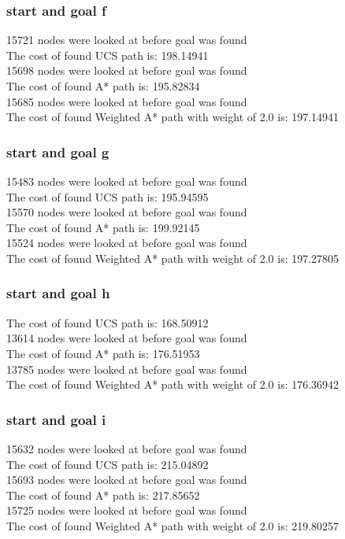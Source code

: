 \documentclass[11pt]{article} %
\begin{document}
\subsubsection{start and goal f}
15721 nodes were looked at before goal was found\\
The cost of found UCS path is: 198.14941\\
15698 nodes were looked at before goal was found\\
The cost of found A* path is: 195.82834\\
15685 nodes were looked at before goal was found\\
The cost of found Weighted A* path with weight of 2.0 is: 197.14941\\
\subsubsection{start and goal g}
15483 nodes were looked at before goal was found\\
The cost of found UCS path is: 195.94595\\
15570 nodes were looked at before goal was found\\
The cost of found A* path is: 199.92145\\
15524 nodes were looked at before goal was found\\
The cost of found Weighted A* path with weight of 2.0 is: 197.27805\\
\subsubsection{start and goal h}
The cost of found UCS path is: 168.50912\\
13614 nodes were looked at before goal was found\\
The cost of found A* path is: 176.51953\\
13785 nodes were looked at before goal was found\\
The cost of found Weighted A* path with weight of 2.0 is: 176.36942\\
\subsubsection{start and goal i}
15632 nodes were looked at before goal was found\\
The cost of found UCS path is: 215.04892\\
15693 nodes were looked at before goal was found\\
The cost of found A* path is: 217.85652\\
15725 nodes were looked at before goal was found\\
The cost of found Weighted A* path with weight of 2.0 is: 219.80257\\
\end{document}
